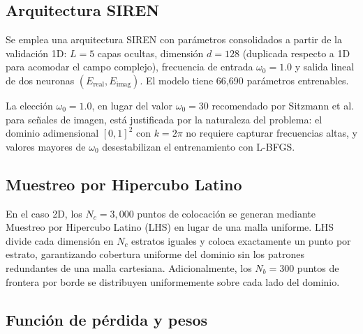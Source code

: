 \subsection{Arquitectura SIREN}
\label{subsec:arquitectura}

Se emplea una arquitectura SIREN con parámetros consolidados a partir de la validación 1D:
$L = 5$ capas ocultas, dimensión $d = 128$ (duplicada respecto a 1D para acomodar el
campo complejo), frecuencia de entrada $\omega_0 = 1.0$ y salida lineal de dos
neuronas $(E_{\mathrm{real}}, E_{\mathrm{imag}})$.
El modelo tiene 66{,}690 parámetros entrenables.

La elección $\omega_0 = 1.0$, en lugar del valor $\omega_0 = 30$ recomendado por
Sitzmann et al. \cite{Sitzmann2020_SIREN} para señales de imagen, está justificada por
la naturaleza del problema: el dominio adimensional $[0,1]^2$ con $k = 2\pi$ no requiere
capturar frecuencias altas, y valores mayores de $\omega_0$ desestabilizan el
entrenamiento con L-BFGS.

\subsection{Muestreo por Hipercubo Latino}
\label{subsec:lhs}

En el caso 2D, los $N_c = 3{,}000$ puntos de colocación se generan mediante
Muestreo por Hipercubo Latino (LHS) \cite{Mckay1979_LHS} en lugar de una malla
uniforme.
LHS divide cada dimensión en $N_c$ estratos iguales y coloca exactamente un punto
por estrato, garantizando cobertura uniforme del dominio sin los patrones redundantes
de una malla cartesiana.
Adicionalmente, los $N_b = 300$ puntos de frontera por borde se distribuyen
uniformemente sobre cada lado del dominio.

\subsection{Función de pérdida y pesos}
\label{subsec:loss}

